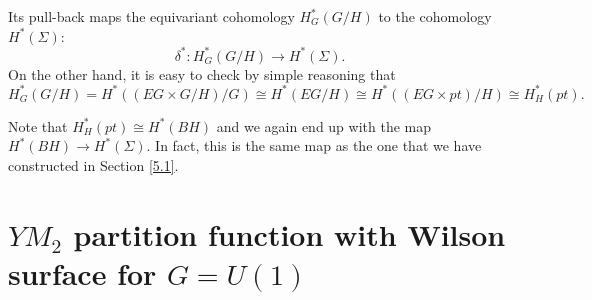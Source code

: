 \documentclass[11pt]{report}
\theoremstyle{plain}
\theoremstyle{definition}
\theoremstyle{remark}
\theoremstyle{remark}
\numberwithin{equation}{section}
\begin{document}
Its pull-back  maps the equivariant cohomology $H^*_G(G/H)$ to the cohomology $H^*(\Sigma)$:
$$
\delta^* :  H^*_G(G/H) \to H^*(\Sigma). 
$$ 
%
On the other hand, it is easy to check by simple reasoning that 
$$
H^*_G(G/H) = H^*((EG\times  G/H)/G)\cong H^*(EG/H) \cong H^*((EG \times pt)/H) \cong H^*_H(pt).
$$

Note that $H^*_H(pt) \cong H^*(BH)$ and we again end up with the map $H^*(BH) \to H^*(\Sigma)$. In fact, this is the same map as the one that we have constructed 
in Section \ref{5.1}.

%

%








%




\section{$YM_2$ partition function with Wilson surface for $G=U(1)$}
\end{document}
